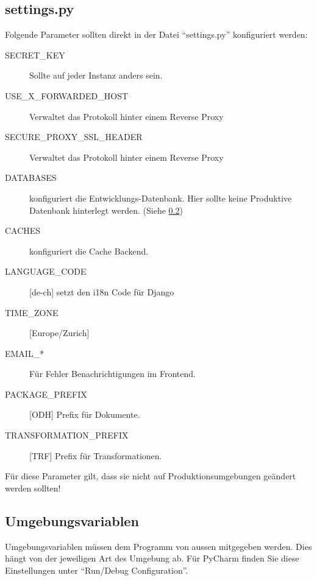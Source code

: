 \subsection{settings.py}
Folgende Parameter sollten direkt in der Datei ``settings.py'' konfiguriert werden:
\begin{description}
\item[SECRET\_KEY] Sollte auf jeder Instanz anders sein.
\item[USE\_X\_FORWARDED\_HOST] Verwaltet das Protokoll hinter einem Reverse Proxy
\item[SECURE\_PROXY\_SSL\_HEADER] Verwaltet das Protokoll hinter einem Reverse Proxy
\item[DATABASES] konfiguriert die Entwicklungs-Datenbank. Hier sollte keine Produktive Datenbank hinterlegt werden. (Siehe \cref{sec:sd:umgebungsvariablen})
\item[CACHES] konfiguriert die Cache Backend.
\item[LANGUAGE\_CODE]{[}de-ch{]} setzt den \acs{i18n} Code für Django
\item[TIME\_ZONE]{[}Europe/Zurich{]}

\item[EMAIL\_*] Für Fehler Benachrichtigungen im Frontend.
\item[PACKAGE\_PREFIX]{[}ODH{]} Prefix für Dokumente. 
\item[TRANSFORMATION\_PREFIX]{[}TRF{]} Prefix für Transformationen.
\end{description}
Für diese Parameter gilt, dass sie nicht auf Produktionsumgebungen geändert werden sollten!
\subsection{Umgebungsvariablen} \label{sec:sd:umgebungsvariablen}
Umgebungsvariablen müssen dem Programm von aussen mitgegeben werden. Dies hängt von der jeweiligen Art des Umgebung ab. Für PyCharm finden Sie diese Einstellungen unter ``Run/Debug Configuration''.


